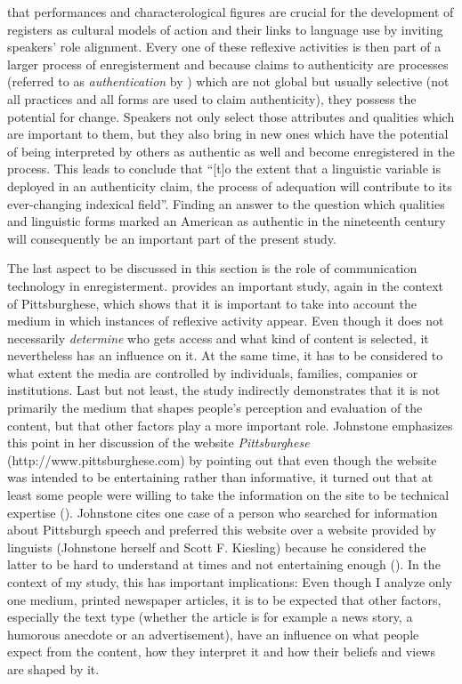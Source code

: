 that performances and characterological figures are crucial for the development of registers as cultural models of action and their links to language use by inviting speakers’ role alignment. Every one of these reflexive activities is then part of a larger process of enregisterment and because claims to authenticity are processes (referred to as \textit{authentication} by \citealt{Bucholtz2005}) which are not global but usually selective (not all practices and all forms are used to claim authenticity), they possess the potential for change. Speakers not only select those attributes and qualities which are important to them, but they also bring in new ones which have the potential of being interpreted by others as authentic as well and become enregistered in the process. This leads \citet[44]{Eckert2014} to conclude that “[t]o the extent that a linguistic variable is deployed in an authenticity claim, the process of adequation will contribute to its ever-changing indexical field”. Finding an answer to the question which qualities and linguistic forms marked an American as authentic in the nineteenth century will consequently be an important part of the present study.

The last aspect to be discussed in this section is the role of communication technology in enregisterment. \citet{Johnstone2011b} provides an important study, again in the context of Pittsburghese, which shows that it is important to take into account the medium in which instances of reflexive activity appear. Even though it does not necessarily \emph{determine} who gets access and what kind of content is selected, it nevertheless has an influence on it. At the same time, it has to be considered to what extent the media are controlled by individuals, families, companies or institutions. Last but not least, the study indirectly demonstrates that it is not primarily the medium that shapes people’s perception and evaluation of the content, but that other factors play a more important role. Johnstone emphasizes this point in her discussion of the website \textit{Pittsburghese} (http://www.pittsburghese.com) by pointing out that even though the website was intended to be entertaining rather than informative, it turned out that at least some people were willing to take the information on the site to be technical expertise (\citeyear[10]{Johnstone2011b}). Johnstone cites one case of a person who searched for information about Pittsburgh speech and preferred this website over a website provided by linguists (Johnstone herself and Scott F. Kiesling) because he considered the latter to be hard to understand at times and not entertaining enough (\citeyear[6]{Johnstone2011b}). In the context of my study, this has important implications: Even though I analyze only one medium, printed newspaper articles, it is to be expected that other factors, especially the text type (whether the article is for example a news story, a humorous anecdote or an advertisement), have an influence on what people expect from the content, how they interpret it and how their beliefs and views are shaped by it.

